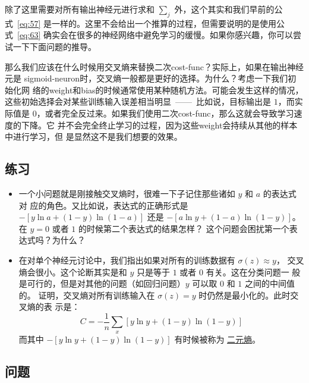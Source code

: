 除了这里需要对所有输出神经元进行求和 $\sum_j$ 外，这个其实和我们早前的公
式~\eqref{eq:57} 是一样的。这里不会给出一个推算的过程，但需要说明的是使用公
式~\eqref{eq:63} 确实会在很多的神经网络中避免学习的缓慢。如果你感兴趣，你可以尝
试一下下面问题的推导。

那么我们应该在什么时候用交叉熵来替换二次\gls*{cost-func}？实际上，如果在输出神经元是%
\gls*{sigmoid-neuron}时，交叉熵一般都是更好的选择。为什么？考虑一下我们初始化网
络的\gls*{weight}和\gls*{bias}的时候通常使用某种随机方法。可能会发生这样的情况，
这些初始选择会对某些训练输入误差相当明显~——~比如说，目标输出是 $1$，而实际值是
$0$，或者完全反过来。如果我们使用二次\gls*{cost-func}，那么这就会导致学习速度的下降。它
并不会完全终止学习的过程，因为这些\gls*{weight}会持续从其他的样本中进行学习，但
是显然这不是我们想要的效果。

\subsection*{练习}

\begin{itemize}
\item 一个小问题就是刚接触交叉熵时，很难一下子记住那些诸如 $y$ 和 $a$ 的表达式对
  应的角色。又比如说，表达式的正确形式是 $-[y \ln a + (1-y) \ln (1-a)]$ 还是
  $-[a \ln y + (1-a) \ln (1-y)]$。在 $y=0$ 或者 $1$ 的时候第二个表达式的结果怎样？
  这个问题会困扰第一个表达式吗？为什么？
\item 在对单个神经元讨论中，我们指出如果对所有的训练数据有 $\sigma(z) \approx y$，
  交叉熵会很小。这个论断其实是和 $y$ 只是等于 $1$ 或者 $0$ 有关。这在分类问题一
  般是可行的，但是对其他的问题（如回归问题）$y$ 可以取 $0$ 和 $1$ 之间的中间值的。
  证明，交叉熵对所有训练输入在 $\sigma(z) = y$ 时仍然是最小化的。此时交叉熵的表
  示是：
  \begin{equation}
    C = -\frac{1}{n} \sum_x [y \ln y+(1-y) \ln(1-y)]
    \label{eq:64}\tag{64}
  \end{equation}
  而其中 $-[y \ln y+(1-y)\ln(1-y)]$ 有时候被称为%
  \href{http://en.wikipedia.org/wiki/Binary_entropy_function}{二元熵}。
\end{itemize}

\subsection*{问题}

